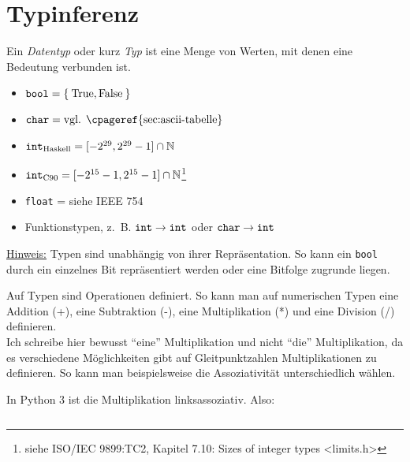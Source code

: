 \chapter{Typinferenz}
\begin{definition}[Datentyp]%
	Ein \textit{Datentyp} oder kurz \textit{Typ} ist eine Menge von Werten, mit
	denen eine Bedeutung verbunden ist.
\end{definition}

\begin{beispiel}[Datentypen]
	\begin{itemize}
		\item $\text{\texttt{bool}} = \Set{\text{True}, \text{False}}$
		\item $\text{\texttt{char}} = \text{vgl. \cpageref{sec:ascii-tabelle}}$
		\item $\text{\texttt{int}}_{\text{Haskell}} = [-2^{29}, 2^{29}-1] \cap \mathbb{N}$
		\item $\text{\texttt{int}}_{\text{C90}} = [-2^{15}-1, 2^{15}-1] \cap \mathbb{N}$\footnote{siehe ISO/IEC 9899:TC2, Kapitel 7.10: Sizes of integer types <limits.h>}
		\item \texttt{float} = siehe IEEE 754
		\item Funktionstypen, z.~B. $\text{\texttt{int}} \rightarrow \text{\texttt{int}}$ oder
			  $\text{\texttt{char}} \rightarrow \text{\texttt{int}}$
	\end{itemize}
\end{beispiel}

\underline{Hinweis:} Typen sind unabhängig von ihrer Repräsentation. So kann ein
\texttt{bool} durch ein einzelnes Bit repräsentiert werden oder eine Bitfolge
zugrunde liegen.

Auf Typen sind Operationen definiert. So kann man auf numerischen Typen eine
Addition (+), eine Subtraktion (-), eine Multiplikation (*) und eine Division (/)
definieren.\\
Ich schreibe hier bewusst \enquote{eine} Multiplikation und nicht \enquote{die}
Multiplikation, da es verschiedene Möglichkeiten gibt auf Gleitpunktzahlen
Multiplikationen zu definieren. So kann man beispielsweise die Assoziativität
unterschiedlich wählen.

\begin{beispiel}
	In Python 3 ist die Multiplikation linksassoziativ. Also:
	\inputminted[numbersep=5pt, tabsize=4]{python}{scripts/python/multiplikation.py}
\end{beispiel}

